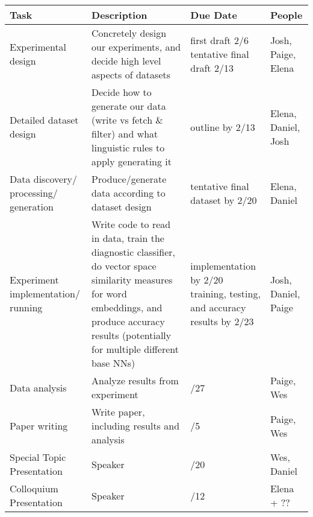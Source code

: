 \documentclass[11pt,a4paper]{article}
\begin{document}
\begin{tabularx}{1.01\textwidth} { 
  | >{\raggedright\arraybackslash}X 
  | >{\centering\arraybackslash}X 
  | >{\centering\arraybackslash}X 
  | >{\raggedleft\arraybackslash}X | }
 \hline
 \textbf{Task} & \textbf{Description} & \textbf{Due Date}  & \textbf{People} \\
 \hline
 Experimental design  &  Concretely design our experiments, and decide high level aspects of datasets
 & {first draft 2/6 \newline
 tentative final draft 2/13} & Josh, Paige, Elena \\
  \hline
 Detailed dataset design  & Decide how to generate our data (write vs fetch \newline \& filter) and what linguistic rules to apply generating 
 it
  & outline by 2/13 & Elena, Daniel, Josh \\
      \hline
 Data discovery\// processing\// generation  & Produce\//generate data according to dataset design
  & tentative final dataset by 2/20 & Elena, Daniel \\
  
      \hline
Experiment implementation\// running & Write code to read in data, train the diagnostic classifier, do vector space similarity measures for word embeddings, and produce accuracy results (potentially for multiple different base NNs)

  &  implementation by 2/20 \newline \newline
  training, testing, and accuracy results by 2/23 & Josh, Daniel, Paige \\
  
   \hline
 Data analysis & Analyze results from experiment
  &  2/27 & Paige, Wes \\
    
   \hline
 Paper writing & Write paper, including results and analysis
  &  3/5 & Paige, Wes \\
   \hline
Special Topic Presentation & Speaker
  &  2/20 & Wes, Daniel \\
     \hline
Colloquium Presentation
 & Speaker
  &  3/12 & Elena + ?? \\
  
  

\hline
\end{tabularx}

\clearpage



\end{document}
